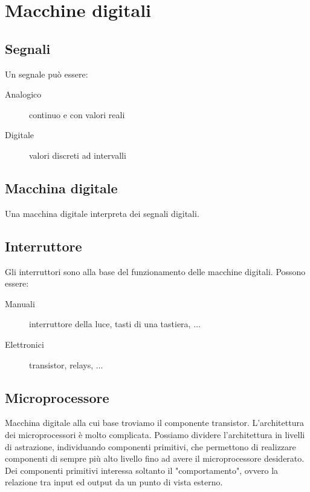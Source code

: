 \documentclass{subfiles}
\begin{document}
\section{Macchine digitali}

\subsection{Segnali}

Un segnale può essere:

\begin{description}
	\item[Analogico] continuo e con valori reali
	\item[Digitale] valori discreti ad intervalli
\end{description}

\subsection{Macchina digitale}

Una macchina digitale interpreta dei segnali digitali.

\subsection{Interruttore}

Gli interruttori sono alla base del funzionamento delle macchine digitali. Possono essere:

\begin{description}
	\item[Manuali] interruttore della luce, tasti di una tastiera, $\dots$
	\item[Elettronici] transistor, relays, $\dots$
\end{description}

\subsection{Microprocessore}

Macchina digitale alla cui base troviamo il componente transistor.
L'architettura dei microprocessori è molto complicata.
Possiamo dividere l'architettura in livelli di astrazione, individuando componenti primitivi, che permettono di realizzare componenti di sempre più alto livello fino ad avere il microprocessore desiderato.
Dei componenti primitivi interessa soltanto il "comportamento", ovvero la relazione tra input ed output da un punto di vista esterno.
\end{document}
